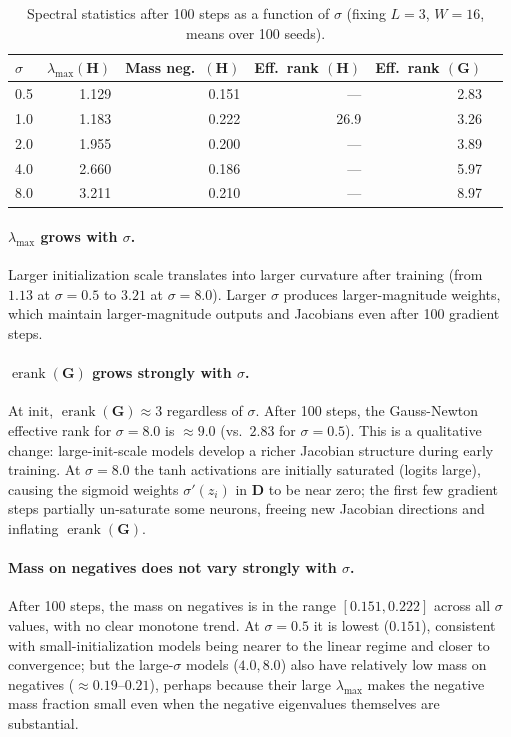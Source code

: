 \documentclass[12pt,a4paper]{article}
\newcommand{\erank}{\operatorname{erank}}
\newcommand{\bH}{\mathbf{H}}
\newcommand{\bG}{\mathbf{G}}
\newcommand{\bD}{\mathbf{D}}
\begin{document}
\begin{table}[H]
  \centering
  \caption{Spectral statistics after 100 steps as a function of $\sigma$
           (fixing $L=3$, $W=16$, means over 100 seeds).}
  \label{tab:step100_sigma}
  \begin{tabular}{@{}lrrrrr@{}}
    \toprule
    $\sigma$ & $\lambda_{\max}(\bH)$ & Mass neg.\ $(\bH)$ & Eff.\ rank $(\bH)$ & Eff.\ rank $(\bG)$ \\
    \midrule
    0.5 & 1.129 & 0.151 & --- & 2.83 \\
    1.0 & 1.183 & 0.222 & 26.9 & 3.26 \\
    2.0 & 1.955 & 0.200 & --- & 3.89 \\
    4.0 & 2.660 & 0.186 & --- & 5.97 \\
    8.0 & 3.211 & 0.210 & --- & 8.97 \\
    \bottomrule
  \end{tabular}
\end{table}

\paragraph{$\lambda_{\max}$ grows with $\sigma$.}
Larger initialization scale translates into larger curvature after training (from $1.13$ at $\sigma=0.5$ to $3.21$ at $\sigma=8.0$). Larger $\sigma$ produces larger-magnitude weights, which maintain larger-magnitude outputs and Jacobians even after 100 gradient steps.

\paragraph{$\erank(\bG)$ grows strongly with $\sigma$.}
At init, $\erank(\bG) \approx 3$ regardless of $\sigma$.
After 100 steps, the Gauss-Newton effective rank for $\sigma=8.0$ is $\approx 9.0$ (vs.\ $2.83$ for $\sigma=0.5$).
This is a qualitative change: large-init-scale models develop a richer Jacobian structure during early training.
At $\sigma=8.0$ the tanh activations are initially saturated (logits large), causing the sigmoid weights $\sigma'(z_i)$ in $\bD$ to be near zero; the first few gradient steps partially un-saturate some neurons, freeing new Jacobian directions and inflating $\erank(\bG)$.

\paragraph{Mass on negatives does not vary strongly with $\sigma$.}
After 100 steps, the mass on negatives is in the range $[0.151, 0.222]$ across all $\sigma$ values, with no clear monotone trend. At $\sigma=0.5$ it is lowest ($0.151$), consistent with small-initialization models being nearer to the linear regime and closer to convergence; but the large-$\sigma$ models ($4.0, 8.0$) also have relatively low mass on negatives ($\approx 0.19$--$0.21$), perhaps because their large $\lambda_{\max}$ makes the negative mass fraction small even when the negative eigenvalues themselves are substantial.
\end{document}
